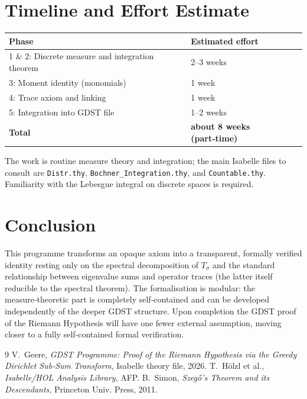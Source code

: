 \documentclass[12pt,a4paper]{article}
\begin{document}
\section{Timeline and Effort Estimate}
\begin{center}
\begin{tabular}{@{}ll@{}}
\toprule
\textbf{Phase} & \textbf{Estimated effort} \\
\midrule
1 \& 2: Discrete measure and integration theorem & 2--3 weeks \\
3: Moment identity (monomials) & 1 week \\
4: Trace axiom and linking & 1 week \\
5: Integration into GDST file & 1--2 weeks \\
\midrule
\textbf{Total} & \textbf{about 8 weeks (part‑time)} \\
\bottomrule
\end{tabular}
\end{center}
The work is routine measure theory and integration; the main Isabelle files to consult are 
\texttt{Distr.thy}, \texttt{Bochner\_Integration.thy}, and \texttt{Countable.thy}.  
Familiarity with the Lebesgue integral on discrete spaces is required.

\section{Conclusion}
This programme transforms an opaque axiom into a transparent, formally verified identity 
resting only on the spectral decomposition of $T_\sigma$ and the standard relationship between 
eigenvalue sums and operator traces (the latter itself reducible to the spectral theorem).  
The formalisation is modular: the measure‑theoretic part is completely self‑contained and 
can be developed independently of the deeper GDST structure.  Upon completion the GDST proof 
of the Riemann Hypothesis will have one fewer external assumption, moving closer to a fully 
self‑contained formal verification.

\begin{thebibliography}{9}
V.~Geere, \emph{GDST Programme: Proof of the Riemann Hypothesis via the Greedy Dirichlet 
Sub‑Sum Transform}, Isabelle theory file, 2026.
T.~H\"olzl et al., \emph{Isabelle/HOL Analysis Library}, AFP.
B.~Simon, \emph{Szegő's Theorem and its Descendants}, Princeton Univ. Press, 2011.
\end{thebibliography}
\end{document}
